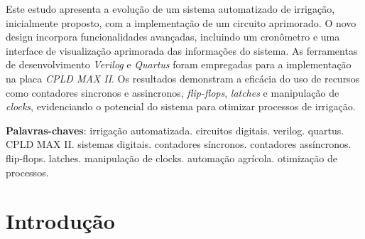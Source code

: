 \documentclass[
	article,			%
	11pt,				%
	oneside,			%
	a4paper,			%
	english,			%
	brazil,				%
	sumario=tradicional
	]{abntex2}
\begin{document}
\frenchspacing 


%
%
\maketitle

\begin{resumoumacoluna}
Este estudo apresenta a evolução de um sistema automatizado de irrigação, inicialmente proposto, com a implementação de um circuito aprimorado. O novo design incorpora funcionalidades avançadas, incluindo um cronômetro e uma interface de visualização aprimorada das informações do sistema. As ferramentas de desenvolvimento \textit{Verilog} e \textit{Quartus} foram empregadas para a implementação na placa \textit{CPLD MAX II}. Os resultados demonstram a eficácia do uso de recursos como contadores sincronos e assincronos, \textit{flip-flops}, \textit{latches} e manipulação de \textit{clocks}, evidenciando o potencial do sistema para otimizar processos de irrigação.
 
 \vspace{\onelineskip}
 
 \noindent
 \textbf{Palavras-chaves}: irrigação automatizada. circuitos digitais. verilog. quartus. CPLD MAX II. sistemas digitais. contadores síncronos. contadores assíncronos. flip-flops. latches. manipulação de clocks. automação agrícola. otimização de processos.
\end{resumoumacoluna}


\textual

\section*{Introdução}
\end{document}
